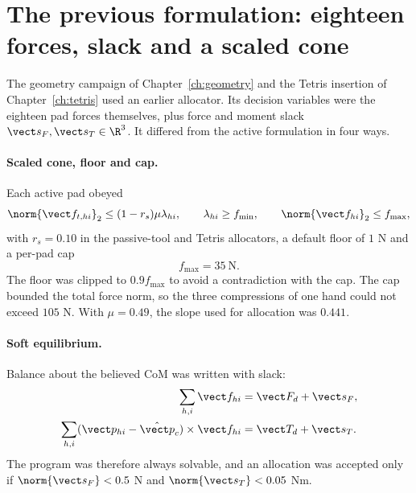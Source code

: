 \section{The previous formulation: eighteen forces, slack and a scaled cone}
\label{sec:socp-previous}

The geometry campaign of Chapter~\ref{ch:geometry} and the Tetris insertion of Chapter~\ref{ch:tetris} used an earlier allocator. Its decision variables were the eighteen pad forces themselves, plus force and moment slack $\vect s_F,\vect s_T\in\R^3$. It differed from the active formulation in four ways.

\paragraph{Scaled cone, floor and cap.}
Each active pad obeyed
\begin{equation}
\norm{\vect f_{t,hi}}_2\leq(1-r_s)\mu\lambda_{hi},\qquad \lambda_{hi}\geq f_{\min},\qquad \norm{\vect f_{hi}}_2\leq f_{\max},
\label{eq:friction-cone}
\end{equation}
with $r_s=0.10$ in the passive-tool and Tetris allocators, a default floor of $1$ N and a per-pad cap
\begin{equation}
f_{\max}=35\ \mathrm{N}.
\label{eq:pad-cap}
\end{equation}
The floor was clipped to $0.9f_{\max}$ to avoid a contradiction with the cap. The cap bounded the total force norm, so the three compressions of one hand could not exceed $105$ N. With $\mu=0.49$, the slope used for allocation was $0.441$.

\paragraph{Soft equilibrium.}
Balance about the believed CoM was written with slack:
\begin{align}
\sum_{h,i}\vect f_{hi}&=\vect F_d+\vect s_F,\nonumber\\
\sum_{h,i}(\vect p_{hi}-\hat{\vect p}_c)\times\vect f_{hi}&=\vect T_d+\vect s_T.
\label{eq:slack-balance}
\end{align}
The program was therefore always solvable, and an allocation was accepted only if $\norm{\vect s_F}<0.5$ N and $\norm{\vect s_T}<0.05$ Nm.

